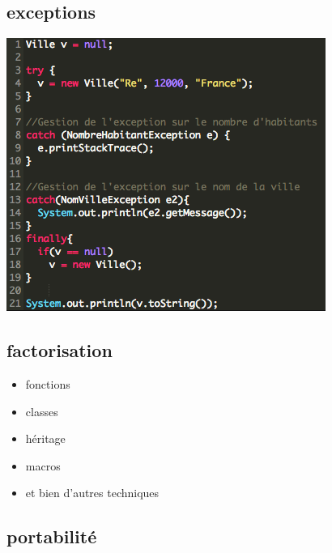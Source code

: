 \documentclass[french]{beamer}%
\begin{document}
		\subsection{exceptions}
		
			\begin{frame}
				\begin{center}
					\includegraphics[scale=0.5]{exceptions}
				\end{center}
			\end{frame}
	
		\subsection{factorisation}
		
			\begin{frame}
				\begin{itemize}
					\item fonctions
					\item classes
					\item héritage
					\item macros
					\item et bien d'autres techniques
				\end{itemize}
			\end{frame}
	
		\subsection{portabilité}
		
\end{document}
